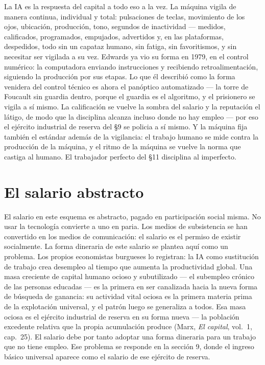 \documentclass[11pt]{article}
\begin{document}
La IA es la respuesta del capital a todo eso a la vez. La máquina
vigila de manera continua, individual y total: pulsaciones de teclas,
movimiento de los ojos, ubicación, producción, tono, segundos de
inactividad --- medidos, calificados, programados, empujados,
advertidos y, en las plataformas, despedidos, todo sin un capataz
humano, sin fatiga, sin favoritismos, y sin necesitar ser vigilada a su
vez. Edwards ya vio su forma en 1979, en el control numérico: la
computadora enviando instrucciones y recibiendo retroalimentación,
siguiendo la producción por sus etapas. Lo que él describió como la
forma venidera del control técnico es ahora el panóptico automatizado
--- la torre de Foucault sin guardia dentro, porque el guardia es el
algoritmo, y el prisionero se vigila a sí mismo. La calificación se
vuelve la sombra del salario y la reputación el látigo, de modo que la
disciplina alcanza incluso donde no hay empleo --- por eso el ejército
industrial de reserva del §9 se policia a sí mismo. Y la máquina fija
también el estándar además de la vigilancia: el trabajo humano se mide
contra la producción de la máquina, y el ritmo de la máquina se vuelve
la norma que castiga al humano. El trabajador perfecto del §11
disciplina al imperfecto.

\section{El salario abstracto}

El salario en este esquema es abstracto, pagado en participación social
misma. No usar la tecnología convierte a uno en paria. Los medios de
subsistencia se han convertido en los medios de comunicación: el salario
es el permiso de existir socialmente. La forma dineraria de este salario
se plantea aquí como un problema. Los propios economistas burgueses lo
registran: la IA como sustitución de trabajo crea desempleo al tiempo
que aumenta la productividad global. Una masa creciente de capital
humano ocioso y subutilizado --- el subempleo crónico de las personas
educadas --- es la primera en ser canalizada hacia la nueva forma de
búsqueda de ganancia: su actividad vital ociosa es la primera materia
prima de la explotación universal, y el patrón luego se generaliza a
todos. Esa masa ociosa es el ejército industrial de reserva en su forma
nueva --- la población excedente relativa que la propia acumulación
produce (Marx, \emph{El capital}, vol.~1, cap.~25). El salario debe por
tanto adoptar una forma dineraria para un trabajo que no tiene empleo.
Ese problema se responde en la sección 9, donde el ingreso básico
universal aparece como el salario de ese ejército de reserva.
\end{document}
